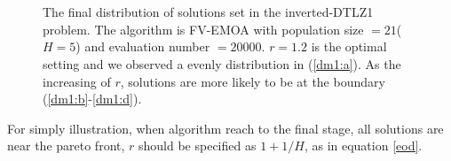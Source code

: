 \documentclass[conference]{IEEEtran}
\begin{document}
\begin{figure}[!t]
  \centering
  \quad
  \\
  \quad
  \\
  \caption{The final distribution of solutions set in the inverted-DTLZ1 problem.
  The algorithm is FV-EMOA with population size $=21$($H=5$) and evaluation number $=20000$.
  $r=1.2$ is the optimal setting and we observed a evenly distribution in (\ref{dm1:a}).
  As the increasing of $r$, solutions are more likely to be at the boundary
  (\ref{dm1:b}-\ref{dm1:d}). 
  }
  \label{dm1}
\end{figure}

For simply illustration,
when algorithm reach to the final stage, all solutions are near the pareto front, $r$ should
be specified as $1+1/H$, as in equation \ref{eod}. 
\end{document}
